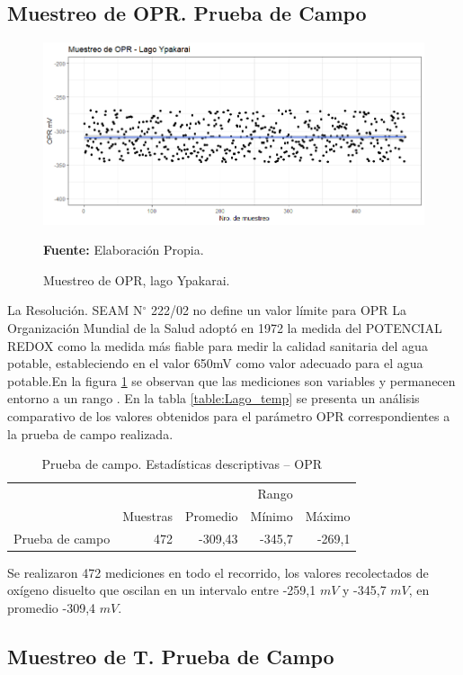 \subsection{Muestreo de OPR. Prueba de Campo}

\begin{figure}[H]
        \centering
        \includegraphics[width=0.75\linewidth]{Imagenes/cap4/OPR_LAGO.png}
        \caption {Muestreo de OPR, lago Ypakarai. }{\textbf{Fuente:}
        Elaboraci\'on Propia. }
        \label{fig:Lago_opr}
\end{figure}
La Resoluci\'on. SEAM N$ ^{\circ}$ 222/02 no define un valor límite para OPR La Organización Mundial de la Salud adoptó en 1972 la medida del POTENCIAL REDOX como la medida más fiable para medir la calidad sanitaria del agua potable, estableciendo en \cite{OPR_10665-39989} el valor 650mV como valor adecuado para el agua potable.En la figura \ref{fig:Lago_opr} se observan que las mediciones son variables y  permanecen entorno a un rango . 
En la tabla \ref{table:Lago_temp} se presenta un an\'alisis comparativo de los valores obtenidos para el par\'ametro OPR correspondientes a la prueba de campo realizada. 
\begin{table}[H]
\centering
\caption{Prueba de campo. Estadísticas descriptivas – OPR}
\label{table:Lago_opr}
\begin{tabular}{lrrrr}
\toprule
          & \multicolumn{3}{r}{Rango} \\  \cline{4-5}
          & Muestras & Promedio & Mínimo & Máximo \\
\midrule
Prueba de campo  &      472 &  -309,43 & -345,7 & -269,1 \\
\bottomrule
\end{tabular}
\end{table}

Se realizaron 472 mediciones en todo el recorrido, los valores recolectados de ox\'igeno disuelto que oscilan en  un intervalo entre -259,1 $mV$ y -345,7 $mV$, en promedio -309,4 $mV$.

\subsection{Muestreo de T. Prueba de Campo}

